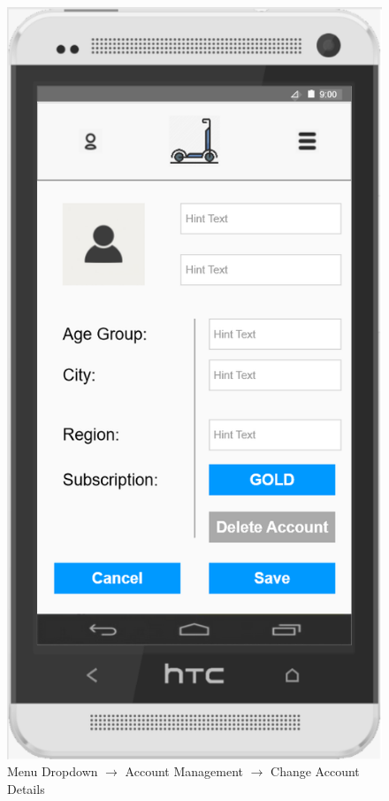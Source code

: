 \documentclass[a4paper, 12pt]{article}
\begin{document}
\begin{figure} [htbp]
  \begin{center}
    \includegraphics[scale=0.75]{images/prototypes/02-01-01-menu-dropdown--account-management--change-account-details.png}
  \end{center}
  \caption{Menu Dropdown $\rightarrow$ Account Management $\rightarrow$ Change Account Details}
\end{figure}
\end{document}

